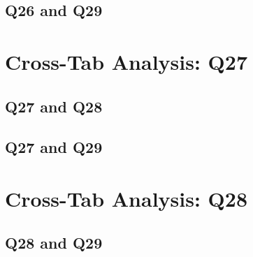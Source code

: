 \documentclass{report}
\begin{document}
\section{Q26 and Q29}\clearpage

\chapter{Cross-Tab Analysis: Q27}

\section{Q27 and Q28}\clearpage
\section{Q27 and Q29}\clearpage

\chapter{Cross-Tab Analysis: Q28}

\section{Q28 and Q29}\clearpage





\end{document}
